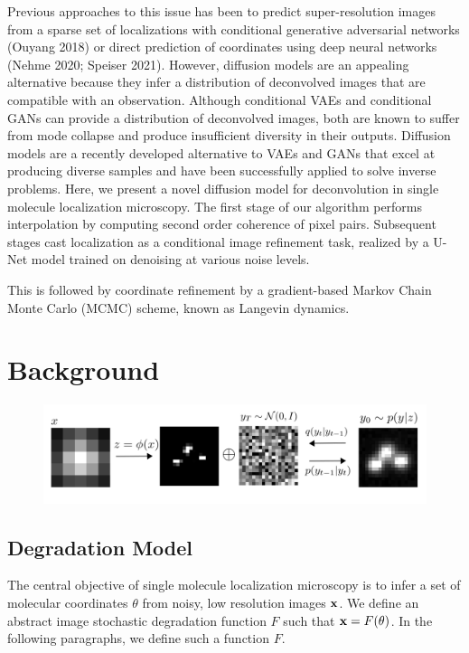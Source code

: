 \documentclass{article}
\begin{document}
Previous approaches to this issue has been to predict super-resolution images from a sparse set of localizations with conditional generative adversarial networks (Ouyang 2018) or direct prediction of coordinates using deep neural networks (Nehme 2020; Speiser 2021). However, diffusion models are an appealing alternative because they infer a distribution of deconvolved images that are compatible with an observation. Although conditional VAEs and conditional GANs can provide a distribution of deconvolved images, both are known to suffer from mode collapse and produce insufficient diversity in their outputs. Diffusion models are a recently developed alternative to VAEs and GANs that excel at producing diverse samples and have been successfully applied to solve inverse problems. Here, we present a novel diffusion model for deconvolution in single molecule localization microscopy. The first stage of our algorithm performs interpolation by computing second order coherence of pixel pairs. Subsequent stages cast localization as a conditional image refinement task, realized by a U-Net model trained on denoising at various noise levels. 

This is followed by coordinate refinement by a gradient-based Markov Chain Monte Carlo (MCMC) scheme, known as Langevin dynamics.


\section{Background}

\begin{figure}
\includegraphics[scale=4.0]{Denoise.png}
\end{figure}

\subsection{Degradation Model}

The central objective of single molecule localization microscopy is to infer a set of molecular coordinates $\theta$ from noisy, low resolution images $\bold{x}$. We define an abstract image stochastic degradation function $F$ such that $\bold{x} = F(\theta)$. In the following paragraphs, we define such a function $F$. 
\end{document}
